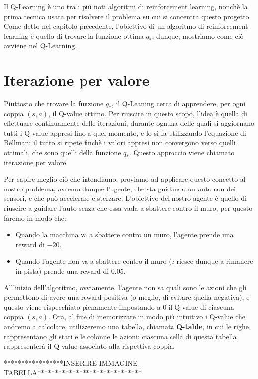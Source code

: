 \documentclass[a4paper,11pt,twoside]{report} %
\begin{document}
Il Q-Learning è uno tra i più noti algoritmi di reinforcement learning, nonchè la prima tecnica usata per risolvere il problema su cui si concentra questo progetto. Come detto nel capitolo precedente, l'obiettivo di un algoritmo di reinforcement learning è quello di trovare la funzione ottima $q_{*}$, dunque, mostriamo come ciò avviene nel Q-Learning.


\section{Iterazione per valore}
Piuttosto che trovare la funzione $q_{*}$, il Q-Leaning cerca di apprendere, per ogni coppia $(s,a)$, il Q-value ottimo. Per riuscire in questo scopo, l'idea è quella di effettuare continuamente delle iterazioni, durante ognuna delle quali si aggiornano tutti i Q-value appresi fino a quel momento, e lo si fa utilizzando l'equazione di Bellman: il tutto si ripete finchè i valori appresi non convergono verso quelli ottimali, che sono quelli della funzione $q_{*}$. Questo approccio viene chiamato iterazione per valore.

Per capire meglio ciò che intendiamo, proviamo ad applicare questo concetto al nostro problema; avremo dunque l'agente, che sta guidando un auto con dei sensori, e che può accelerare e sterzare. L'obiettivo del nostro agente è quello di riuscire a guidare l'auto senza che essa vada a sbattere contro il muro, per questo faremo in modo che:

\begin{itemize}
	\item Quando la macchina va a sbattere contro un muro, l'agente prende una reward di $-20$.
	\item Quando l'agente non va a sbattere contro il muro (e riesce dunque a rimanere in pista) prende una reward di $0.05$.
\end{itemize}

All'inizio dell'algoritmo, ovviamente, l'agente non sa quali sono le azioni che gli permettono di avere una reward positiva (o meglio, di evitare quella negativa), e questo viene rispecchiato pienamente impostando a $0$ il Q-value di ciascuna coppia $(s,a)$. Ora, al fine di memorizzare in modo più intuitivo i Q-value che andremo a calcolare, utilizzeremo una tabella, chiamata \textbf{Q-table}, in cui le righe rappresentano gli stati e le colonne le azioni: ciascuna cella di questa tabella rappresenterà il Q-value associato alla rispettiva coppia.

*****************INSERIRE IMMAGINE TABELLA******************************
\end{document}
